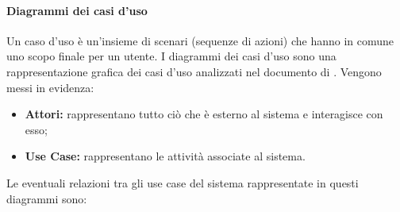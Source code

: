 \paragraph*{Diagrammi dei casi d'uso}
Un caso d'uso è un'insieme di scenari (sequenze di azioni) che hanno in comune uno scopo finale per un utente. I diagrammi dei casi d'uso sono una rappresentazione grafica dei casi d'uso analizzati nel documento di \AdR{}. Vengono messi in evidenza:
\begin{itemize}
	\item \textbf{Attori:} rappresentano tutto ciò che è esterno al sistema e interagisce con esso;
	\item \textbf{Use Case:} rappresentano le attività associate al sistema.
\end{itemize}
Le eventuali relazioni tra gli use case del sistema rappresentate in questi diagrammi sono: 
